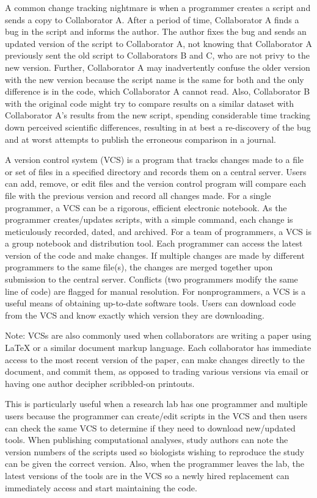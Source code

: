 \documentclass[ChapterTOCs,krantz2]{krantz} %
\begin{document}
A common change tracking nightmare 
is when a programmer creates a script 
and sends a copy to Collaborator A. After a period of time, 
Collaborator A finds a bug in the script and informs
the author. The author fixes the bug and sends an updated version 
of the script to Collaborator A, not knowing that Collaborator A 
previously sent the
old script to Collaborators B and C, who are not privy to the new version.  
Further, Collaborator A may inadvertently confuse the older
version with the new version because the script name is the same for both and
the only difference is in the code, which Collaborator A cannot read. Also, 
Collaborator B with the original code might try to compare
results on a similar dataset with Collaborator A's results from the new script,
spending considerable time tracking down perceived scientific differences, 
resulting in at best a re-discovery of the bug and at
worst attempts to publish the erroneous comparison in a journal.  

A version control system
(VCS) is a program that tracks changes made to a file or set of files in a specified
directory and records them on a central server. Users can add, remove,
or edit files and the version control program will compare each file
with the previous version and record all changes made. For a single programmer,
a VCS can be a rigorous, efficient electronic notebook.  As the programmer
creates/updates scripts, with a simple command, each change is meticulously
recorded, dated, and archived.  For a team of programmers, a VCS
is a group notebook and distribution tool.  Each programmer can access the
latest version of the code and make changes.  If multiple changes are made by
different programmers to the same file(s), the changes are merged together 
upon submission to the central server. Conflicts (two
programmers modify the same line of code) are flagged for manual resolution.  
For nonprogrammers, a VCS is a
useful means of obtaining up-to-date software tools.  Users can download code
from the VCS and know exactly which version they are downloading.

Note: VCSs are also commonly used when collaborators are writing 
a paper using LaTeX or a similar document markup language.  Each collaborator 
has immediate access to the most recent version of the paper, can make 
changes directly to the document, and commit them, as opposed 
to trading various versions via email or having one author decipher scribbled-on 
printouts.

This is particularly useful when a research lab has one programmer 
and multiple users because the programmer can create/edit scripts in
the VCS and then users can check the same VCS to determine if they need to
download new/updated tools.  When publishing 
computational analyses, study
authors can note the version numbers of the scripts used so biologists
wishing to reproduce the study can be given the correct version.
Also, when the programmer leaves the lab, the latest versions of the
tools are in the VCS so a newly hired replacement can immediately
access and start maintaining the code.
\end{document}

